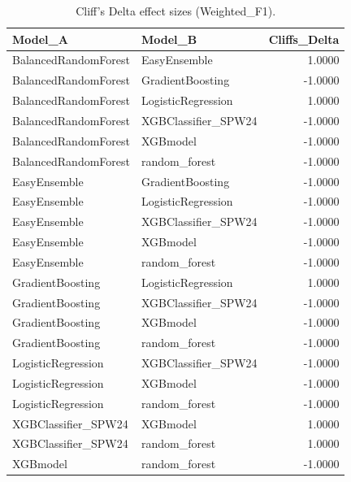 \begin{table}[t]
\centering
\begin{tabular}{llr}
\toprule
Model_A & Model_B & Cliffs_Delta \\
\midrule
BalancedRandomForest & EasyEnsemble & 1.0000 \\
BalancedRandomForest & GradientBoosting & -1.0000 \\
BalancedRandomForest & LogisticRegression & 1.0000 \\
BalancedRandomForest & XGBClassifier_SPW24 & -1.0000 \\
BalancedRandomForest & XGBmodel & -1.0000 \\
BalancedRandomForest & random_forest & -1.0000 \\
EasyEnsemble & GradientBoosting & -1.0000 \\
EasyEnsemble & LogisticRegression & -1.0000 \\
EasyEnsemble & XGBClassifier_SPW24 & -1.0000 \\
EasyEnsemble & XGBmodel & -1.0000 \\
EasyEnsemble & random_forest & -1.0000 \\
GradientBoosting & LogisticRegression & 1.0000 \\
GradientBoosting & XGBClassifier_SPW24 & -1.0000 \\
GradientBoosting & XGBmodel & -1.0000 \\
GradientBoosting & random_forest & -1.0000 \\
LogisticRegression & XGBClassifier_SPW24 & -1.0000 \\
LogisticRegression & XGBmodel & -1.0000 \\
LogisticRegression & random_forest & -1.0000 \\
XGBClassifier_SPW24 & XGBmodel & 1.0000 \\
XGBClassifier_SPW24 & random_forest & 1.0000 \\
XGBmodel & random_forest & -1.0000 \\
\bottomrule
\end{tabular}
\caption{Cliff's Delta effect sizes (Weighted_F1).}
\label{tab:cliffs_Weighted_F1}
\end{table}